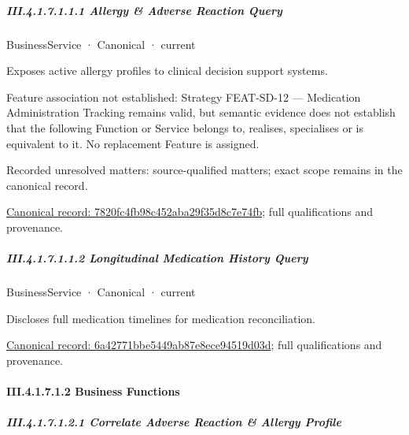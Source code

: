 \subparagraph*{III.4.1.7.1.1.1 Allergy \& Adverse Reaction Query}
\label{navigation:III.4.1.7.1.1.1}

\label{element:7820fc4fb98c452aba29f35d8c7e74fb}
{\small BusinessService · Canonical · current}\par

Exposes active allergy profiles to clinical decision support systems.



Feature association not established: Strategy FEAT-SD-12 — Medication Administration Tracking remains valid, but semantic evidence does not establish that the following Function or Service belongs to, realises, specialises or is equivalent to it. No replacement Feature is assigned.


{\small Recorded unresolved matters: source-qualified matters; exact scope remains in the canonical record.}\par
{\footnotesize \href{../../../../../../../continuum/business/business-service/7820fc4fb98c452aba29f35d8c7e74fb.md}{Canonical record: 7820fc4fb98c452aba29f35d8c7e74fb}; full qualifications and provenance.}\par
\subparagraph*{III.4.1.7.1.1.2 Longitudinal Medication History Query}
\label{navigation:III.4.1.7.1.1.2}

\label{element:6a42771bbe5449ab87e8ece94519d03d}
{\small BusinessService · Canonical · current}\par

Discloses full medication timelines for medication reconciliation.


{\footnotesize \href{../../../../../../../continuum/business/business-service/6a42771bbe5449ab87e8ece94519d03d.md}{Canonical record: 6a42771bbe5449ab87e8ece94519d03d}; full qualifications and provenance.}\par
\paragraph*{III.4.1.7.1.2 Business Functions}
\label{navigation:III.4.1.7.1.2}

\subparagraph*{III.4.1.7.1.2.1 Correlate Adverse Reaction \& Allergy Profile}
\label{navigation:III.4.1.7.1.2.1}

